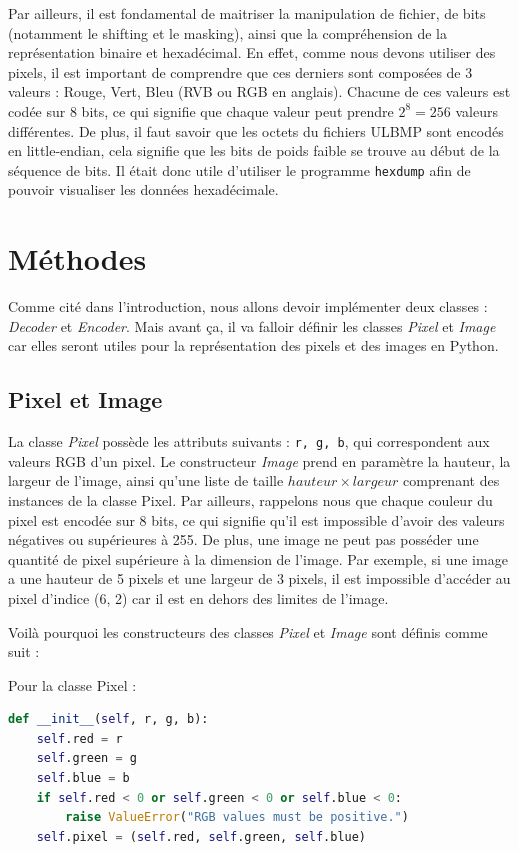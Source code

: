 \documentclass[utf8]{article}
\begin{document}
Par ailleurs, il est fondamental de maitriser la manipulation de fichier, de bits (notamment le shifting et le masking), ainsi que la compréhension de la représentation binaire et hexadécimal. En effet, comme nous devons utiliser des pixels, il est important de comprendre que ces derniers sont composées de 3 valeurs : Rouge, Vert, Bleu (RVB ou RGB en anglais). Chacune de ces valeurs est codée sur 8 bits, ce qui signifie que chaque valeur peut prendre $2^8 = 256$ valeurs différentes. De plus, il faut savoir que les octets du fichiers ULBMP sont encodés en little-endian, cela signifie que les bits de poids faible se trouve au début de la séquence de bits. Il était donc utile d'utiliser le programme \texttt{hexdump} afin de pouvoir visualiser les données hexadécimale.

\section{Méthodes}
Comme cité dans l'introduction, nous allons devoir implémenter deux classes : \textit{Decoder} et \textit{Encoder}. Mais avant ça, il va falloir définir les classes \textit{Pixel} et \textit{Image} car elles seront utiles pour la représentation des pixels et des images en Python.
\subsection{Pixel et Image}
La classe \textit{Pixel} possède les attributs suivants : \texttt{r, g, b}, qui correspondent aux valeurs RGB d'un pixel. Le constructeur \textit{Image} prend en paramètre la hauteur, la largeur de l'image, ainsi qu'une liste de taille $hauteur \times largeur$ comprenant des instances de la classe Pixel.
Par ailleurs, rappelons nous que chaque couleur du pixel est encodée sur 8 bits, ce qui signifie qu'il est impossible d'avoir des valeurs négatives ou supérieures à 255. De plus, une image ne peut pas posséder une quantité de pixel supérieure à la dimension de l'image. Par exemple, si une image a une hauteur de 5 pixels et une largeur de 3 pixels, il est impossible d'accéder au pixel d'indice (6, 2) car il est en dehors des limites de l'image.

Voilà pourquoi les constructeurs des classes \textit{Pixel} et \textit{Image} sont définis comme suit :

Pour la classe Pixel : 
\begin{lstlisting}[language=Python, basicstyle=\small]
def __init__(self, r, g, b):
    self.red = r
    self.green = g
    self.blue = b
    if self.red < 0 or self.green < 0 or self.blue < 0:
        raise ValueError("RGB values must be positive.")
    self.pixel = (self.red, self.green, self.blue)
\end{lstlisting}
\end{document}
